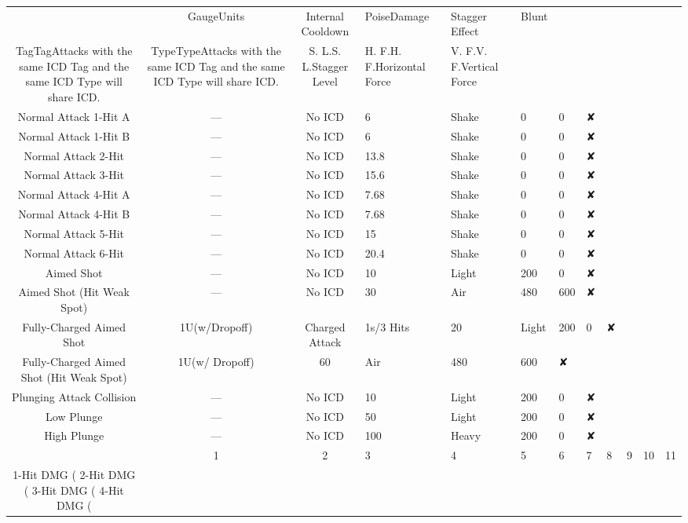 \documentclass[a4paper,12pt]{article}
\begin{document}
\begin{tabular}{|c|c|c|}
 & GaugeUnits & Internal Cooldown & PoiseDamage & Stagger Effect & Blunt \\
TagTagAttacks with the same ICD Tag and the same ICD Type will share ICD. & TypeTypeAttacks with the same ICD Tag and the same ICD Type will share ICD. & S. L.S. L.Stagger Level & H. F.H. F.Horizontal Force & V. F.V. F.Vertical Force \\
Normal Attack 1-Hit A & — & No ICD & 6 & Shake & 0 & 0 & ✘ \\
Normal Attack 1-Hit B & — & No ICD & 6 & Shake & 0 & 0 & ✘ \\
Normal Attack 2-Hit & — & No ICD & 13.8 & Shake & 0 & 0 & ✘ \\
Normal Attack 3-Hit & — & No ICD & 15.6 & Shake & 0 & 0 & ✘ \\
Normal Attack 4-Hit A & — & No ICD & 7.68 & Shake & 0 & 0 & ✘ \\
Normal Attack 4-Hit B & — & No ICD & 7.68 & Shake & 0 & 0 & ✘ \\
Normal Attack 5-Hit & — & No ICD & 15 & Shake & 0 & 0 & ✘ \\
Normal Attack 6-Hit & — & No ICD & 20.4 & Shake & 0 & 0 & ✘ \\
Aimed Shot & — & No ICD & 10 & Light & 200 & 0 & ✘ \\
Aimed Shot (Hit Weak Spot) & — & No ICD & 30 & Air & 480 & 600 & ✘ \\
Fully-Charged Aimed Shot & 1U(w/Dropoff) & Charged Attack & 1s/3 Hits & 20 & Light & 200 & 0 & ✘ \\
Fully-Charged Aimed Shot (Hit Weak Spot) & 1U(w/ Dropoff) & 60 & Air & 480 & 600 & ✘ \\
Plunging Attack Collision & — & No ICD & 10 & Light & 200 & 0 & ✘ \\
Low Plunge & — & No ICD & 50 & Light & 200 & 0 & ✘ \\
High Plunge & — & No ICD & 100 & Heavy & 200 & 0 & ✘ \\
 & 1 & 2 & 3 & 4 & 5 & 6 & 7 & 8 & 9 & 10 & 11 \\
1-Hit DMG (%
2-Hit DMG (%
3-Hit DMG (%
4-Hit DMG (%

\end{tabular}
\end{document}
